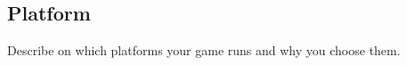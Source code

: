 \subsection{Platform}
Describe on which platforms your game runs and why you choose them.

\pagebreak